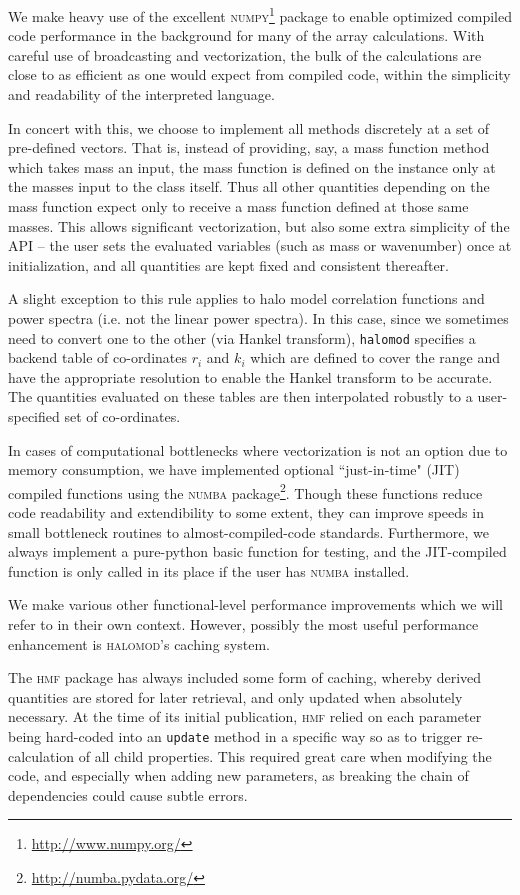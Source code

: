 \documentclass[5p]{elsarticle}
\begin{document}
We make heavy use of the excellent \textsc{numpy}\footnote{\url{http://www.numpy.org/}} package to enable optimized compiled code performance in the background for many of the array calculations. With careful use of broadcasting and vectorization, the bulk of the calculations are close to as efficient as one would expect from compiled code, within the simplicity and readability of the interpreted language.

In concert with this, we choose to implement all methods discretely at a set of pre-defined vectors. That is, instead of providing, say, a mass function method which takes mass an input, the mass function is defined on the instance only
at the masses input to the class itself. Thus all other quantities depending
on the mass function expect only to receive a mass function defined at those
same masses. This allows significant vectorization, but also some extra simplicity of the API -- the user sets the evaluated variables (such as mass or wavenumber) once at initialization, and all quantities are kept fixed and consistent thereafter. 

A slight exception to this rule applies to halo model correlation functions and power spectra (i.e. not the linear power spectra). In this case, since we sometimes need to convert one to the other (via Hankel transform), \verb|halomod| specifies a backend table of co-ordinates $r_i$ and $k_i$ which are defined to cover the range and have the appropriate resolution to enable the Hankel transform to be accurate. The quantities evaluated on these tables are then interpolated robustly to a user-specified set of co-ordinates.

In cases of computational bottlenecks where vectorization is not an option due to memory consumption, we have implemented optional ``just-in-time" (JIT) compiled functions using the \textsc{numba} package\footnote{\url{http://numba.pydata.org/}}. Though these functions reduce code readability and extendibility to some extent, they can improve speeds in small bottleneck routines to almost-compiled-code standards. Furthermore, we always implement a pure-python basic function for testing, and the JIT-compiled function is only called in its place if the user has \textsc{numba} installed. 

We make various other functional-level performance improvements which we will refer to in their own context. However, possibly the most useful performance enhancement is \textsc{halomod}'s caching system.


The \textsc{hmf} package has always included some form of caching, whereby derived quantities are stored for later retrieval, and only updated when absolutely necessary. At the time of its initial publication, \textsc{hmf} relied on each parameter being hard-coded into an \verb|update| method in a specific way so as to trigger re-calculation of all child properties. This required great care when modifying the code, and especially when adding new parameters, as breaking the chain of dependencies could cause subtle errors. 
\end{document}
